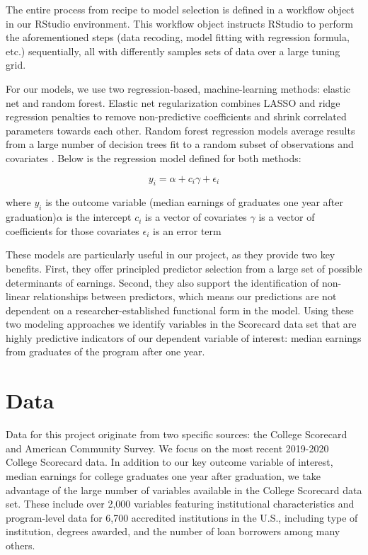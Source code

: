 \documentclass[a4paper, 12pt]{article}
\begin{document}

The entire process from recipe to model selection is defined in a
workflow object in our RStudio environment. This workflow object
instructs RStudio to perform the aforementioned steps (data recoding,
model fitting with regression formula, etc.) sequentially, all with
differently samples sets of data over a large tuning grid.

For our models, we use two regression-based, machine-learning methods:
elastic net and random forest. Elastic net regularization combines
LASSO and ridge regression penalties to remove non-predictive
coefficients and shrink correlated parameters towards each
other. Random forest regression models average results from a large
number of decision trees fit to a random subset of observations and
covariates \parencite{Hastie_etal_2016}. Below is the regression model
defined for both methods:

\[y_i = \alpha + c_i\gamma + \epsilon_i\]

\pagebreak

\noindent where \newline $y_i$ is the outcome variable (median
earnings of graduates one year after graduation)\newline $\alpha$ is
the intercept \newline $c_i$ is a vector of covariates \newline
$\gamma$ is a vector of coefficients for those covariates \newline
$\epsilon_i$ is an error term

These models are particularly useful in our project, as they provide
two key benefits. First, they offer principled predictor selection
from a large set of possible determinants of earnings. Second, they
also support the identification of non-linear relationships between
predictors, which means our predictions are not dependent on a
researcher-established functional form in the model. Using these two
modeling approaches we identify variables in the Scorecard data set
that are highly predictive indicators of our dependent variable of
interest: median earnings from graduates of the program after one
year.


\section*{Data}

Data for this project originate from two specific sources: the College
Scorecard and American Community Survey. We focus on the most recent
2019-2020 College Scorecard data. In addition to our key outcome
variable of interest, median earnings for college graduates one year
after graduation, we take advantage of the large number of variables
available in the College Scorecard data set. These include over 2,000
variables featuring institutional characteristics and program-level
data for 6,700 accredited institutions in the U.S., including type of
institution, degrees awarded, and the number of loan borrowers among
many others.
\end{document}
